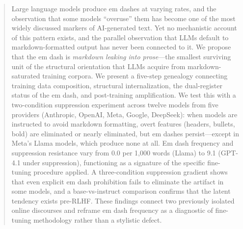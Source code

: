 \begin{abstract}
Large language models produce em dashes at varying rates, and the observation that some models ``overuse'' them has become one of the most widely discussed markers of AI-generated text. Yet no mechanistic account of this pattern exists, and the parallel observation that LLMs default to markdown-formatted output has never been connected to it. We propose that the em dash is \textit{markdown leaking into prose}---the smallest surviving unit of the structural orientation that LLMs acquire from markdown-saturated training corpora. We present a five-step genealogy connecting training data composition, structural internalization, the dual-register status of the em dash, and post-training amplification. We test this with a two-condition suppression experiment across twelve models from five providers (Anthropic, OpenAI, Meta, Google, DeepSeek): when models are instructed to avoid markdown formatting, overt features (headers, bullets, bold) are eliminated or nearly eliminated, but em dashes persist---except in Meta's Llama models, which produce none at all. Em dash frequency and suppression resistance vary from 0.0 per 1,000 words (Llama) to 9.1 (GPT-4.1 under suppression), functioning as a signature of the specific fine-tuning procedure applied. A three-condition suppression gradient shows that even explicit em dash prohibition fails to eliminate the artifact in some models, and a base-vs-instruct comparison confirms that the latent tendency exists pre-RLHF. These findings connect two previously isolated online discourses and reframe em dash frequency as a diagnostic of fine-tuning methodology rather than a stylistic defect.
\end{abstract}
